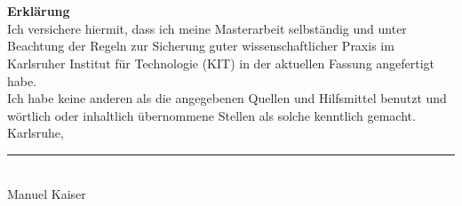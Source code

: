 \chapter*{}
\begin{flushleft}
\vspace{5cm}
\textbf{Erklärung}\\[0,5cm]
Ich versichere hiermit, dass ich meine Masterarbeit selbständig und unter Beachtung der Regeln zur Sicherung guter wissenschaftlicher Praxis im Karlsruher Institut für Technologie (KIT) in der aktuellen Fassung angefertigt habe. \\
Ich habe keine anderen als die angegebenen Quellen und Hilfsmittel benutzt und wörtlich oder inhaltlich übernommene Stellen als solche kenntlich gemacht.\\[1cm]

Karlsruhe, \submissiondate \\[2cm]

\rule{5cm}{0.4pt} \\

Manuel Kaiser

\end{flushleft}
